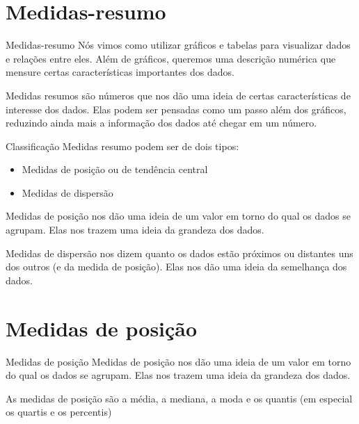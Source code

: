 \documentclass[
  9pt,
  ignorenonframetext,
  aspectratio=169]{beamer}
\subtitle{Métodos Quantitativos Aplicados à Ciência Política}
\author{Frederico Bertholini}
\date{23.nov.2020}
\begin{document}
\begin{frame}[allowframebreaks]
  \tableofcontents[hideallsubsections]
\end{frame}
\hypertarget{medidas-resumo}{%
\section{Medidas-resumo}\label{medidas-resumo}}

\begin{frame}{Medidas-resumo}
Nós vimos como utilizar gráficos e tabelas para visualizar dados e
relações entre eles. Além de gráficos, queremos uma descrição numérica
que mensure certas características importantes dos dados.

Medidas resumos são números que nos dão uma ideia de certas
características de interesse dos dados. Elas podem ser pensadas como um
passo além dos gráficos, reduzindo ainda mais a informação dos dados até
chegar em um número.
\end{frame}

\begin{frame}{Classificação}
\protect\hypertarget{classificauxe7uxe3o}{}
Medidas resumo podem ser de dois tipos:

\begin{itemize}
\item
  Medidas de posição ou de tendência central
\item
  Medidas de dispersão
\end{itemize}

Medidas de posição nos dão uma ideia de um valor em torno do qual os
dados se agrupam. Elas nos trazem uma ideia da grandeza dos dados.

Medidas de dispersão nos dizem quanto os dados estão próximos ou
distantes uns dos outros (e da medida de posição). Elas nos dão uma
ideia da semelhança dos dados.
\end{frame}

\hypertarget{medidas-de-posiuxe7uxe3o}{%
\section{Medidas de posição}\label{medidas-de-posiuxe7uxe3o}}

\begin{frame}{Medidas de posição}
Medidas de posição nos dão uma ideia de um valor em torno do qual os
dados se agrupam. Elas nos trazem uma ideia da grandeza dos dados.

As medidas de posição são a média, a mediana, a moda e os quantis (em
especial os quartis e os percentis)
\end{frame}
\end{document}

